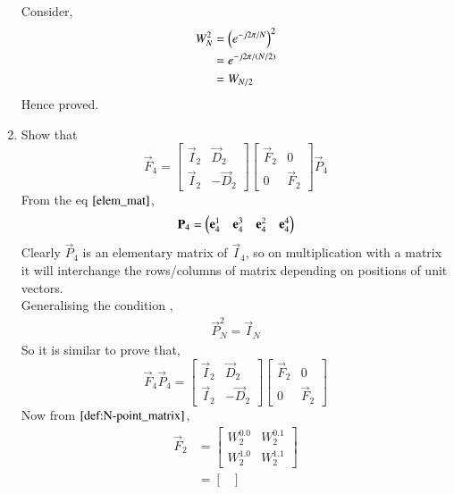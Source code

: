 \documentclass[journal,12pt,twocolumn]{IEEEtran}
\renewcommand\thesection{\arabic{section}}
\begin{document}
\begin{enumerate}[label=\arabic*.,ref=\thesection.\theenumi]
	Consider,
	\begin{align}
		W_{N}^{2} &= \left(e^{-j2\pi/N}\right)^2 \\
		&= e^{-j2\pi/\left(N/2\right)} \\
		&= W_{N/2}\label{result}
	\end{align}
	Hence proved.\\
	\item Show that 
	\begin{equation}
		\vec{F}_{4}=
		\begin{bmatrix}
			\vec{I}_{2} & \vec{D}_{2} \\
			\vec{I}_{2} & -\vec{D}_{2}
		\end{bmatrix}
		\begin{bmatrix}
			\vec{F}_{2} & 0 \\
			0 & \vec{F}_{2}
		\end{bmatrix}
		\vec{P}_{4}
	\end{equation}
	\solution From the eq $\eqref{elem_mat}$,
	\begin{align}
		\mathbf{P}_4 = \begin{pmatrix}\mathbf{e}_4^{1} &\mathbf{e}_4^{3} &\mathbf{e}_4^{2} &\mathbf{e}_4^{4} \end{pmatrix}
	\end{align}
	Clearly $\vec{P}_4$ is an elementary matrix of $\vec{I}_{4}$, so on multiplication with a matrix it will interchange the rows/columns of matrix depending on positions of unit vectors.\\
	Generalising the condition ,
	\begin{align}
		\vec{P}_{N}^2 = \vec{I}_{N} \label{fft-4}
	\end{align}
	So it is similar to prove that, 
	\begin{equation} 
		\vec{F}_{4}\vec{P}_{4}=
		\begin{bmatrix}
			\vec{I}_{2} & \vec{D}_{2} \\
			\vec{I}_{2} & -\vec{D}_{2}
		\end{bmatrix}
		\begin{bmatrix}
			\vec{F}_{2} & 0 \\
			0 & \vec{F}_{2}   
		\end{bmatrix}                    
	\end{equation}
	Now from $\eqref{def:N-point_matrix}$,
	\begin{align}
		\vec{F}_{2} &= 
		\begin{bmatrix}
			W_2^{0.0} & W_2^{0.1} \\
			W_2^{1.0} & W_2^{1.1}
		\end{bmatrix} \\
		&= \begin{bmatrix}

\end{bmatrix}
\end{align}
\end{enumerate}
\end{document}
